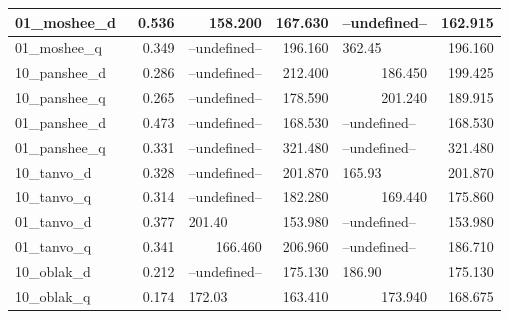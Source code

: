 \documentclass[a4paper]{article}
\begin{document}
\begin{table}[H]
\begin{tabular}{|l|r|l|r|l|r|}
\hline
01\_moshee\_d~  & 0.536                         & \multicolumn{1}{r|}{158.200} & 167.630                            & --undefined--                & 162.915                          \\ 
\hline
01\_moshee\_q~  & 0.349                         & --undefined--                & 196.160                            & 362.45                       & 196.160                          \\ 
\hline
10\_panshee\_d~ & 0.286                         & --undefined--                & 212.400                            & \multicolumn{1}{r|}{186.450} & 199.425                          \\ 
\hline
10\_panshee\_q~ & 0.265                         & --undefined--                & 178.590                            & \multicolumn{1}{r|}{201.240} & 189.915                          \\ 
\hline
01\_panshee\_d~ & 0.473                         & --undefined--                & 168.530                            & --undefined--                & 168.530                          \\ 
\hline
01\_panshee\_q~ & 0.331                         & --undefined--                & 321.480                            & --undefined--                & 321.480                          \\ 
\hline
10\_tanvo\_d~   & 0.328                         & --undefined--                & 201.870                            & 165.93                       & 201.870                          \\ 
\hline
10\_tanvo\_q~   & 0.314                         & --undefined--                & 182.280                            & \multicolumn{1}{r|}{169.440} & 175.860                          \\ 
\hline
01\_tanvo\_d~   & 0.377                         & 201.40                       & 153.980                            & --undefined--                & 153.980                          \\ 
\hline
01\_tanvo\_q~   & 0.341                         & \multicolumn{1}{r|}{166.460} & 206.960                            & --undefined--                & 186.710                          \\ 
\hline
10\_oblak\_d~   & 0.212                         & --undefined--                & 175.130                            & 186.90                       & 175.130                          \\ 
\hline
10\_oblak\_q~   & 0.174                         & 172.03                       & 163.410                            & \multicolumn{1}{r|}{173.940} & 168.675                          \\ 

\end{tabular}
\end{table}
\end{document}
